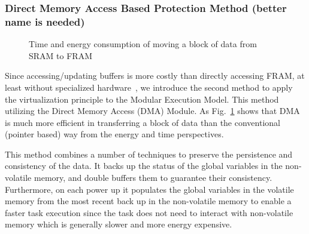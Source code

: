 \subsubsection{ Direct Memory Access Based Protection Method (better name is needed)}
%
	\begin{figure}[t]
		\centering
		\caption{Time and energy consumption of moving a block of data from SRAM to FRAM}
		\label{fig:dmaTimeEnergy}
	\end{figure}
%
	Since accessing/updating buffers is more costly than directly accessing FRAM, at least without specialized hardware~\cite{clank}, we introduce the second method to apply the virtualization principle to the Modular Execution Model. This method utilizing the Direct Memory Access (DMA) Module. As Fig.~\ref{fig:dmaTimeEnergy} shows that DMA is much more efficient in transferring a block of data than the conventional (pointer based) way from the energy and time perspectives. 

	This method combines a number of techniques to preserve the persistence and consistency of the data. It backs up the status of the global variables in the non-volatile memory, and double buffers them to guarantee their consistency. Furthermore, on each power up it populates the global variables in the volatile memory from the most recent back up in the non-volatile memory to enable a faster task execution since the task does not need to interact with non-volatile memory which is generally slower and more energy expensive.   

